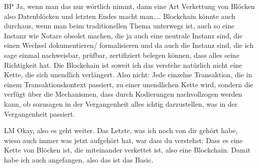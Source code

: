 \begin{xlist}
     \item[BP] Ja, wenn man das nur wörtlich nimmt, dann eine Art Verkettung von Blöcken also Datenblöcken und letzten Endes macht man.... Blockchain könnte auch durchaus, wenn man beim traditionellen Thema unterwegs ist, auch so eine Instanz wie Notare obsolet machen, die ja auch eine neutrale Instanz sind, die einen Wechsel dokumentieren/ formalisieren und da auch die Instanz sind, die ich sage einmal nachweisbar, prüfbar, zertifiziert belegen können, dass alles seine Richtigkeit hat. Die Blockchain ist soweit ich das verstehe natürlich nicht eine Kette, die sich unendlich verlängert. Also nicht: Jede einzelne Transaktion, die in einem Transaktionskontext passiert, zu einer unendlichen Kette wird, sondern die verfügt über die Mechanismen, dass durch Kodierungen nachvollzogen werden kann, ob sozusagen in der Vergangenheit alles ichtig darzustellen, was in der Vergangenheit passiert. 
     \item[LM] Okay, also es geht weiter. Das Letzte, was ich noch von dir gehört habe, wieso auch immer was jetzt aufgehört hat, war dass du verstehst: Dass es eine Kette von Blöcken ist, die miteinander verkettet ist, also eine Blockchain. Damit habe ich auch angefangen, also das ist das Basic. 

\end{xlist}
